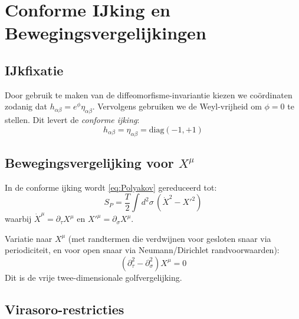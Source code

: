 \documentclass[12pt,a4paper]{article}
\begin{document}
    \section{Conforme IJking en Bewegingsvergelijkingen}

        \subsection{IJkfixatie}

            Door gebruik te maken van de diffeomorfisme-invariantie kiezen we co\"ordinaten zodanig dat $h_{\alpha\beta} = e^\phi \eta_{\alpha\beta}$. Vervolgens gebruiken we de Weyl-vrijheid om $\phi = 0$ te stellen. Dit levert de \emph{conforme ijking}:
            \begin{equation}
                h_{\alpha\beta} = \eta_{\alpha\beta} = \mathrm{diag}(-1,+1)
            \end{equation}

        \subsection{Bewegingsvergelijking voor $X^\mu$}

            In de conforme ijking wordt \eqref{eq:Polyakov} gereduceerd tot:
            \begin{equation}
                S_P = \frac{T}{2}\int d^2\sigma\,\left(\dot X^2 - X'^2\right)
            \end{equation}
            waarbij $\dot X^\mu = \partial_\tau X^\mu$ en $X'^\mu = \partial_\sigma X^\mu$.

            Variatie naar $X^\mu$ (met randtermen die verdwijnen voor gesloten snaar via periodiciteit, en voor open snaar via Neumann/Dirichlet randvoorwaarden):
            \begin{equation}
                \boxed{\left(\partial_\tau^2 - \partial_\sigma^2\right)X^\mu = 0}
                \label{eq:golfvgl}
            \end{equation}
            Dit is de vrije twee-dimensionale golfvergelijking.

        \subsection{Virasoro-restricties}
\end{document}
